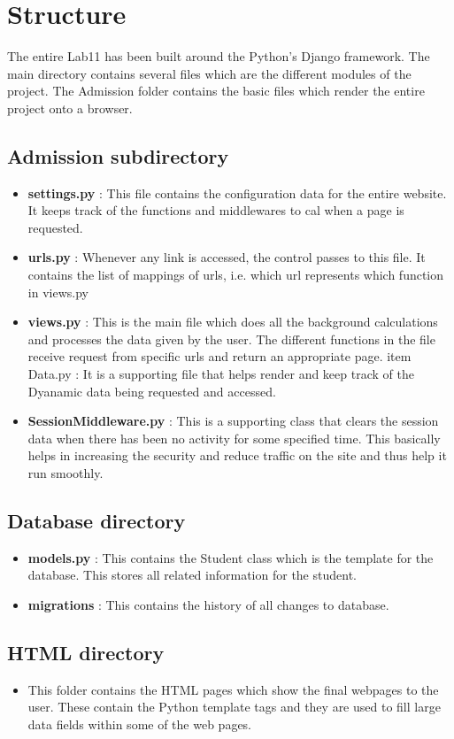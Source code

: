\documentclass[]{report}
\begin{document}
\section{Structure}
The entire Lab11 has been built around the Python's Django framework. The main directory contains several files which are the different modules of the project. The Admission folder contains the basic files which render the entire project onto a browser.
\subsection{Admission subdirectory}
\begin{itemize}
\item \textbf{settings.py} : This file contains the configuration data for the entire website. It keeps track of the functions and middlewares to cal when a page is requested.
\item \textbf{urls.py} : Whenever any link is accessed, the control passes to this file. It contains the list of mappings of urls, i.e. which url represents which function in views.py
\item \textbf{views.py} : This is the main file which does all the background calculations and processes the data given by the user. The different functions in the file receive request from specific urls and return an appropriate page.
item Data.py : It is a supporting file that helps render and keep track of the Dyanamic data being requested and accessed.
\item \textbf{SessionMiddleware.py} : This is a supporting class that clears the session data when there has been no activity for some specified time. This basically helps in increasing the security and reduce traffic on the site and thus help it run smoothly.
\end{itemize}
\subsection{Database directory}
\begin{itemize}
\item \textbf{models.py} : This contains the Student class which is the template for the database. This stores all related information for the student.
\item \textbf{migrations} : This contains the history of all changes to database.
\end{itemize}
\subsection{HTML directory}
\begin{itemize}
\item This folder contains the HTML pages which show the final webpages to the user. These contain the Python template tags and they are used to fill large data fields within some of the web pages.
\end{itemize}
\end{document}
